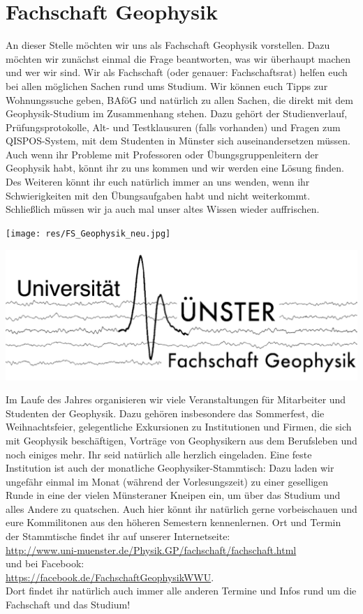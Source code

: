 \section{Fachschaft Geophysik}
\begin{multicols*}{2}
An dieser Stelle möchten wir uns als Fachschaft Geophysik vorstellen.
Dazu möchten wir zunächst einmal die Frage beantworten, was wir überhaupt machen und wer wir sind.
Wir als Fachschaft (oder genauer: Fachschaftsrat) helfen euch bei allen möglichen Sachen rund ums Studium.
Wir können euch Tipps zur Wohnungssuche geben, BAföG und natürlich zu allen Sachen, die direkt mit dem Geophysik-Studium im Zusammenhang stehen.
Dazu gehört der Studienverlauf, Prüfungsprotokolle, Alt- und Testklausuren (falls vorhanden) und Fragen zum QISPOS-System, mit dem Studenten in Münster sich auseinandersetzen müssen.
Auch wenn ihr Probleme mit Professoren oder Übungsgruppenleitern der Geophysik habt, könnt ihr zu uns kommen und wir werden eine Lösung finden.
Des Weiteren könnt ihr euch natürlich immer an uns wenden, wenn ihr Schwierigkeiten mit den Übungsaufgaben habt und nicht weiterkommt.
Schließlich müssen wir ja auch mal unser altes Wissen wieder auffrischen.

\begin{center}
	\texttt{[image: res/FS\_Geophysik\_neu.jpg]}
	
	\includegraphics[width=0.8\columnwidth]{res/fs_geophysik_logo_neu.jpg}
\end{center}

Im Laufe des Jahres organisieren wir viele Veranstaltungen für Mitarbeiter und Studenten der Geophysik.
Dazu gehören insbesondere das Sommerfest, die Weihnachtsfeier, gelegentliche Exkursionen zu Institutionen und Firmen, die sich mit Geophysik beschäftigen, Vorträge von Geophysikern aus dem Berufsleben und noch einiges mehr.
Ihr seid natürlich alle herzlich eingeladen.
Eine feste Institution ist auch der monatliche Geophysiker-Stammtisch:
Dazu laden wir ungefähr einmal im Monat (während der Vorlesungszeit) zu einer geselligen Runde in eine der vielen Münsteraner Kneipen ein, um über das Studium und alles Andere zu quatschen.
Auch hier könnt ihr natürlich gerne vorbeischauen und eure Kommilitonen aus den höheren Semestern kennenlernen.
Ort und Termin der Stammtische findet ihr auf unserer Internetseite:\\
\url{http://www.uni-muenster.de/Physik.GP/fachschaft/fachschaft.html}\\
und bei Facebook:\\
\url{https://facebook.de/FachschaftGeophysikWWU}.\\
Dort findet ihr natürlich auch immer alle anderen Termine und Infos rund um die Fachschaft und das Studium!


\end{multicols*}
